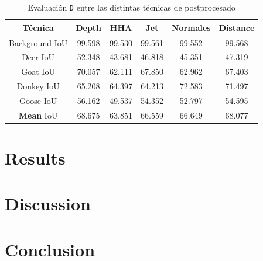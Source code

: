 \documentclass[12pt,a4paper]{report}
\begin{document}
\begin{table}
    \centering
    \begin{tabular}{|c|c|c|c|c|c|}
        \hline
        Técnica & Depth & HHA & Jet & Normales & Distance\\
        \hline
        \hline
        Background IoU & 99.598 & 99.530 & 99.561 & 99.552 & 99.568\\
        \hline
        Deer IoU & 52.348 & 43.681 & 46.818 & 45.351 & 47.319\\
        \hline
        Goat IoU & 70.057 & 62.111 & 67.850 & 62.962 & 67.403\\
        \hline
        Donkey IoU & 65.208 & 64.397 & 64.213 & 72.583 & 71.497\\
        \hline
        Goose IoU & 56.162 & 49.537 & 54.352 & 52.797 & 54.595\\
        \hline
        \textbf{Mean} IoU & 68.675 & 63.851 & 66.559 & 66.649 & 68.077\\
        \hline
    \end{tabular}
    \caption{Evaluación \texttt{D} entre las distintas técnicas de postprocesado}
    \label{tab:techniques-d-comparison}
\end{table}

\chapter{Results}
\label{chap:results}

\chapter{Discussion}
\label{chap:discussion}

\chapter{Conclusion}
\label{chap:conclusion}




\appendix
\label{app:appendix_a}
\end{document}
